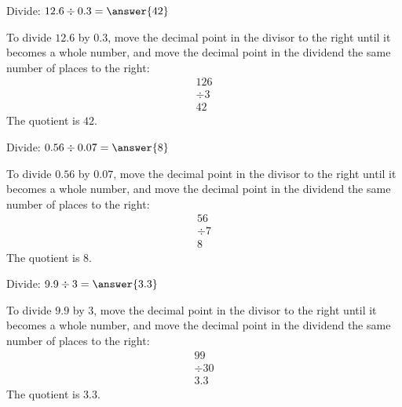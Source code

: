 \documentclass{ximera}
\begin{document}
\begin{problem}
Divide: $12.6 \div 0.3 = \answer{42}$
\begin{feedback}
To divide $12.6$ by $0.3$, move the decimal point in the divisor to the right until it becomes a whole number, and move the decimal point in the dividend the same number of places to the right:
\begin{align*}
  126 \\
\div 3 \\
\hline
  42
\end{align*}
The quotient is $42$.
\end{feedback}
\end{problem}

\begin{problem}
Divide: $0.56 \div 0.07 = \answer{8}$
\begin{feedback}
To divide $0.56$ by $0.07$, move the decimal point in the divisor to the right until it becomes a whole number, and move the decimal point in the dividend the same number of places to the right:
\begin{align*}
  56 \\
\div 7 \\
\hline
  8
\end{align*}
The quotient is $8$.
\end{feedback}
\end{problem}

\begin{problem}
Divide: $9.9 \div 3 = \answer{3.3}$
\begin{feedback}
To divide $9.9$ by $3$, move the decimal point in the divisor to the right until it becomes a whole number, and move the decimal point in the dividend the same number of places to the right:
\begin{align*}
  99 \\
\div 30 \\
\hline
  3.3
\end{align*}
The quotient is $3.3$.
\end{feedback}
\end{problem}

\end{document}
